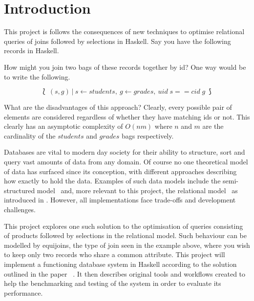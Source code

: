 \chapter{Introduction}
\begin{comment}
The introduction should summarise the subject area, the specific problem you are addressing, including key ideas for their solution, together with a summary of the project's main contributions. When detailing the contributions it is helpful to provide forward references to the section(s) of the report that provide the relevant technical details. The introduction should be aimed at an informed, but otherwise non-expert, reader. A good tip is to assume that all your assessors will read the abstract and introduction, whereas the more detailed technical sections may only be read by your first and second markers - it's therefore really important to get it right.
\end{comment}

This project is follows the consequences of new techniques to optimise
relational queries of joins followed by selections in Haskell. Say you have the
following records in Haskell.



\noindent
How might you join two bags of these records together by id? One way would be to
write the following.

\[\lbag\:(s, g)\:|\:s \leftarrow students,\:g \leftarrow grades,\:uid\;s == cid\;g
\:\rbag\]

What are the disadvantages of this approach? Clearly, every possible pair of
elements are considered regardless of whether they have matching ids or not.
This clearly has an asymptotic complexity of $O(nm)$ where $n$ and $m$ are the
cardinality of the $students$ and $grades$ bags respectively.

Databases are vital to modern day society for their ability to structure, sort
and query vast amounts of data from any domain. Of course no one theoretical
model of data has surfaced since its conception, with different approaches
describing how exactly to hold the data. Examples of such data models include
the semi-structured model~\cite{DatabaseSystems} and, more relevant to this
project, the relational model~\cite{RelationalModel} as introduced in
. However, all implementations face trade-offs and
development challenges.

This project explores one such solution to the optimisation of queries
consisting of products followed by selections in the relational model. Such
behaviour can be modelled by equijoins, the type of join seen in the example
above, where you wish to keep only two records who share a common attribute.
This project will implement a functioning database system in Haskell according
to the solution outlined in the paper
\relalg{}~\cite{RelationalAlgebraByWayOfAdjunctions}. It then describes original
tools and workflows created to help the benchmarking and testing of the system
in order to evaluate its performance.


